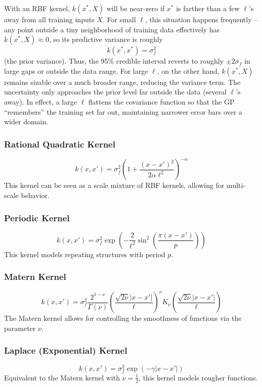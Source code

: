 \documentclass{article}
\begin{document}
With an RBF kernel, $k(x^*, X)$ will be near-zero if $x^*$ is farther than a few $\ell$'s away from all training inputs $X$. 
For small $\ell$, this situation happens frequently – any point outside a tiny neighborhood of training data effectively has $k(x^*, X) 
\approx 0$, so its predictive variance is roughly
\[
k(x^*, x^*) = \sigma_f^2
\]
(the prior variance). Thus, the 95\% credible interval reverts to roughly $\pm 2\sigma_f$ in large gaps or outside the data range.
For large $\ell$, on the other hand, $k(x^*, X)$ remains sizable over a much broader range, reducing the variance term. The uncertainty
only approaches the prior level far outside the data (several $\ell$'s away). In effect, a large $\ell$ flattens the covariance function
so that the GP “remembers” the training set far out, maintaining narrower error bars over a wider domain.




\subsubsection*{Rational Quadratic Kernel}
\[
k(x, x') = \sigma_f^2 \left( 1 + \frac{(x - x')^2}{2 \alpha \ell^2} \right)^{-\alpha}
\]
This kernel can be seen as a scale mixture of RBF kernels, allowing for multi-scale behavior.


\subsubsection*{Periodic Kernel}
\[
k(x, x') = \sigma_f^2 \exp\left( -\frac{2}{\ell^2} \sin^2\left( \frac{\pi (x - x')}{p} \right) \right)
\]
This kernel models repeating structures with period \( p \).

\subsubsection*{Matern Kernel}
\[
k(x, x') = \sigma_f^2 \frac{2^{1-\nu}}{\Gamma(\nu)} \left( \frac{\sqrt{2\nu} |x - x'|}{\ell} \right)^\nu K_\nu\left( \frac{\sqrt{2\nu} |x - x'|}{\ell} \right)
\]
The Matern kernel allows for controlling the smoothness of functions via the parameter \( \nu \).


\subsubsection*{Laplace (Exponential) Kernel}
\[
k(x, x') = \sigma_f^2 \exp\left( -\gamma |x - x'| \right)
\]
Equivalent to the Matern kernel with \( \nu = \frac{1}{2} \), this kernel models rougher functions.
\end{document}
